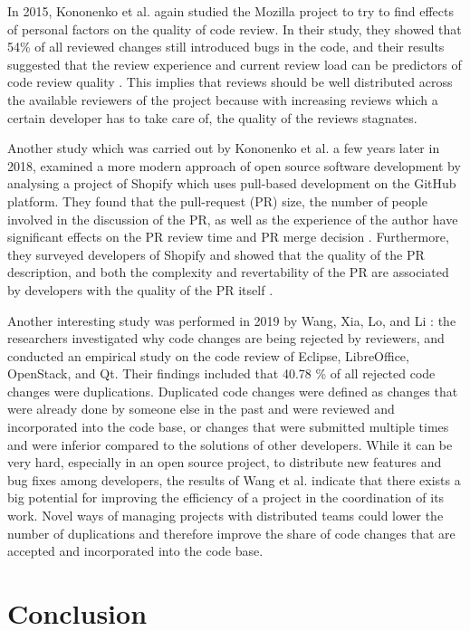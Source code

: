\documentclass[conference]{IEEEtran}
\begin{document}
In 2015, Kononenko et al. again studied the Mozilla project to try to find effects of personal factors on the quality of code review. In their study, they showed that 54\% of all reviewed changes still introduced bugs in the code, and their results suggested that the review experience and current review load can be predictors of code review quality \cite{kononenko2015investigating}. This implies that reviews should be well distributed across the available reviewers of the project because with increasing reviews which a certain developer has to take care of, the quality of the reviews stagnates.

Another study which was carried out by Kononenko et al. a few years later in 2018, examined a more modern approach of open source software development by analysing a project of Shopify which uses pull-based development on the GitHub platform. They found that the pull-request (PR) size, the number of people involved in the discussion of the PR, as well as the experience of the author have significant effects on the PR review time and PR merge decision \cite{kononenko2018studying}. Furthermore, they surveyed developers of Shopify and showed that the quality of the PR description, and both the complexity and revertability of the PR are associated by developers with the quality of the PR itself \cite{kononenko2018studying}.

Another interesting study was performed in 2019 by Wang, Xia, Lo, and Li \cite{wang2019my}: the researchers investigated why code changes are being rejected by reviewers, and conducted an empirical study on the code review of Eclipse, LibreOffice, OpenStack, and Qt. Their findings included that 40.78 \% of all rejected code changes were duplications. Duplicated code changes were defined as changes that were already done by someone else in the past and were reviewed and incorporated into the code base, or changes that were submitted multiple times and were inferior compared to the solutions of other developers. While it can be very hard, especially in an open source project, to distribute new features and bug fixes among developers, the results of Wang et al. indicate that there exists a big potential for improving the efficiency of a project in the coordination of its work. Novel ways of managing projects with distributed teams could lower the number of duplications and therefore improve the share of code changes that are accepted and incorporated into the code base.

\section{Conclusion}
\end{document}
